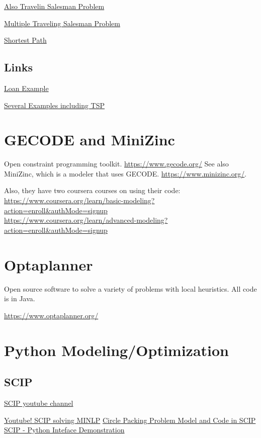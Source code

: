 \documentclass[letter,12pt]{book}
\renewcommand{\0}{\mathbf{0}}
\begin{document}
\href{https://www.youtube.com/watch?v=UQYJvSjXE6I}{Also Travelin Salesman Problem}

\href{https://www.youtube.com/watch?v=owHq3Mbniqo}{Multiple Traveling Salesman Problem}

\href{https://www.youtube.com/watch?v=JkZkGxVZ8ao}{Shortest Path}

\subsection{Links}
\href{https://github.com/lobodemonte/excel-solver-loan-example}{Loan Example}

\href{https://github.com/Bhargavanarasimhan/Excel-Solver-Files}{Several Examples including TSP}


\section{GECODE and MiniZinc}
Open constraint programming toolkit.
\url{https://www.gecode.org/}
See also MiniZinc, which is a modeler that uses GECODE.
\url{https://www.minizinc.org/}.

Also, they have two coursera courses on using their code:
\url{https://www.coursera.org/learn/basic-modeling?action=enroll&authMode=signup}\\
\url{https://www.coursera.org/learn/advanced-modeling?action=enroll&authMode=signup}


\section{Optaplanner}
Open source software to solve a variety of problems with local heuristics.  All code is in Java.  

\url{https://www.optaplanner.org/}
\section{Python Modeling/Optimization}
\subsection{SCIP}
\href{https://www.youtube.com/channel/UCpu5Kj1Q9SQ1kZ1QlwsurAQ}{SCIP youtube channel}

\href{https://www.youtube.com/watch?v=FFqGzckSRW4}{Youtube! SCIP solving MINLP}
\href{https://youtu.be/FFqGzckSRW4?t=734}{Circle Packing Problem Model and Code in SCIP}
\href{https://www.youtube.com/watch?v=7SvapoXVYq0}{SCIP - Python Inteface Demonstration}
\end{document}
